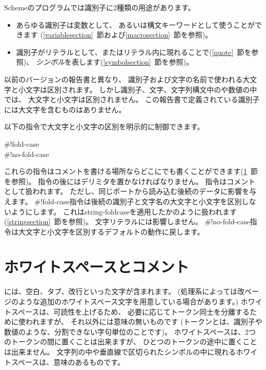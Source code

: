 \vest Schemeのプログラムでは識別子に2種類の用途があります。
\begin{itemize}
\item あらゆる識別子は変数として、
あるいは構文キーワードとして使うことができます
(\ref{variablesection}~節および\ref{macrosection}~節を参照)。

\item 識別子がリテラルとして、またはリテラル内に現れることで(\ref{quote}~節を参照)、
{\em シンボル}を表します(\ref{symbolsection}~節を参照)。
\end{itemize}

以前のバージョンの報告書\cite{R5RS}と異なり、
識別子および文字の名前で使われる大文字と小文字は区別されます。
しかし識別子、文字、文字列構文中のや数値の中では、
大文字と小文字は区別されません。
この報告書で定義されている識別子には大文字を含むものはありません。

以下の指令で大文字と小文字の区別を明示的に制御できます。

\begin{entry}{%
{\cf{}\#!fold-case}\\
{\cf{}\#!no-fold-case}}

これらの指令はコメントを書ける場所ならどこにでも書くことができます(\ref{wscommentsection}~節を参照)。
指令の後にはデリミタを置かなければなりません。
指令はコメントとして扱われます。
ただし、同じポートから読み込む後続のデータに影響を与えます。
{\cf{}\#!fold-case}指令は後続の識別子と文字名の大文字と小文字を区別しないようにします。
これは{\cf string-foldcase}を適用したかのように扱われます(\ref{stringsection}~節を参照)。
文字リテラルには影響しません。
{\cf{}\#!no-fold-case}指令は大文字と小文字を区別するデフォルトの動作に戻します。
\end{entry}



\section{ホワイトスペースとコメント}
\label{wscommentsection}

には、空白、タブ、改行といった文字が含まれます。
(処理系によっては改ページのような追加のホワイトスペース文字を用意している場合があります。)
ホワイトスペースは、可読性を上げるため、
必要に応じてトークン同士を分離するために使われますが、
それ以外には意味の無いものです
(トークンとは、識別子や数値のような、分割できない字句単位のことです)。
ホワイトスペースは、2つのトークンの間に置くことは出来ますが、
ひとつのトークンの途中に置くことは出来ません。
文字列の中や垂直線で区切られたシンボルの中に現れるホワイトスペースは、意味のあるものです。

